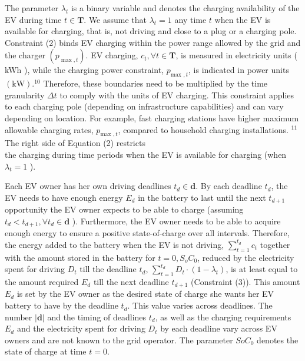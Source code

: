 \documentclass[10pt]{article}
\begin{document}
The parameter $\lambda_{t}$ is a binary variable and denotes the charging availability of the EV during time $t \in \mathbf{T}$. We assume that $\lambda_{t}=1$ any time $t$ when the EV is available for charging, that is, not driving and close to a plug or a charging pole. Constraint (2) binds EV charging within the power range allowed by the grid and the charger $\left(p_{\max , t}\right)$. EV charging, $c_{t}, \forall t \in \mathbf{T}$, is measured in electricity units ( kWh ), while the charging power constraint, $p_{\text {max }, t}$, is indicated in power units $(\mathrm{kW}) .^{10}$ Therefore, these boundaries need to be multiplied by the time granularity $\Delta t$ to comply with the units of EV charging. This constraint applies to each charging pole (depending on infrastructure capabilities) and can vary depending on location. For example, fast charging stations have higher maximum allowable charging rates, $p_{\text {max }, t}$, compared to household charging installations. ${ }^{11}$ The right side of Equation (2) restricts\\
the charging during time periods when the EV is available for charging (when $\lambda_{t}=1$ ).

Each EV owner has her own driving deadlines $t_{d} \in \mathbf{d}$. By each deadline $t_{d}$, the EV needs to have enough energy $E_{d}$ in the battery to last until the next $t_{d+1}$ opportunity the EV owner expects to be able to charge (assuming $t_{d}<t_{d+1}, \forall t_{d} \in \mathbf{d}$ ). Furthermore, the EV owner needs to be able to acquire enough energy to ensure a positive state-of-charge over all intervals. Therefore, the energy added to the battery when the EV is not driving, $\sum_{t=1}^{t_{d}} c_{t}$ together with the amount stored in the battery for $t=0, S_{o} C_{0}$, reduced by the electricity spent for driving $D_{t}$ till the deadline $t_{d}$, $\sum_{t=1}^{t_{d}} D_{t} \cdot\left(1-\lambda_{t}\right)$, is at least equal to the amount required $E_{d}$ till the next deadline $t_{d+1}$ (Constraint (3)). This amount $E_{d}$ is set by the EV owner as the desired state of charge she wants her EV battery to have by the deadline $t_{d}$. This value varies across deadlines. The number $|\mathbf{d}|$ and the timing of deadlines $t_{d}$, as well as the charging requirements $E_{d}$ and the electricity spent for driving $D_{t}$ by each deadline vary across EV owners and are not known to the grid operator. The parameter $S o C_{0}$ denotes the state of charge at time $t=0$.
\end{document}
